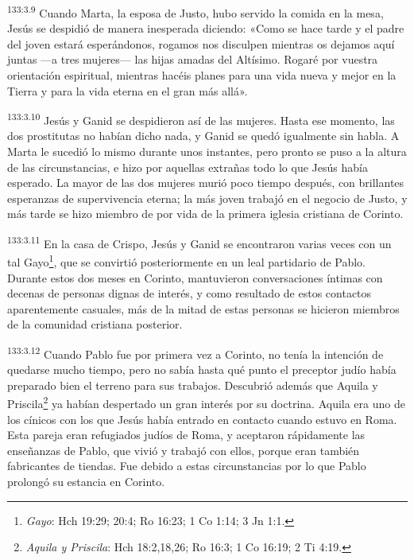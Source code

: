 \par 
\textsuperscript{133:3.9} Cuando Marta, la esposa de Justo, hubo servido la comida en la mesa, Jesús se despidió de manera inesperada diciendo: «Como se hace tarde y el padre del joven estará esperándonos, rogamos nos disculpen mientras os dejamos aquí juntas ---a tres mujeres--- las hijas amadas del Altísimo. Rogaré por vuestra orientación espiritual, mientras hacéis planes para una vida nueva y mejor en la Tierra y para la vida eterna en el gran más allá».

\par 
\textsuperscript{133:3.10} Jesús y Ganid se despidieron así de las mujeres. Hasta ese momento, las dos prostitutas no habían dicho nada, y Ganid se quedó igualmente sin habla. A Marta le sucedió lo mismo durante unos instantes, pero pronto se puso a la altura de las circunstancias, e hizo por aquellas extrañas todo lo que Jesús había esperado. La mayor de las dos mujeres murió poco tiempo después, con brillantes esperanzas de supervivencia eterna; la más joven trabajó en el negocio de Justo, y más tarde se hizo miembro de por vida de la primera iglesia cristiana de Corinto.

\par 
\textsuperscript{133:3.11} En la casa de Crispo, Jesús y Ganid se encontraron varias veces con un tal Gayo\footnote{\textit{Gayo}: Hch 19:29; 20:4; Ro 16:23; 1 Co 1:14; 3 Jn 1:1.}, que se convirtió posteriormente en un leal partidario de Pablo. Durante estos dos meses en Corinto, mantuvieron conversaciones íntimas con decenas de personas dignas de interés, y como resultado de estos contactos aparentemente casuales, más de la mitad de estas personas se hicieron miembros de la comunidad cristiana posterior.

\par 
\textsuperscript{133:3.12} Cuando Pablo fue por primera vez a Corinto, no tenía la intención de quedarse mucho tiempo, pero no sabía hasta qué punto el preceptor judío había preparado bien el terreno para sus trabajos. Descubrió además que Aquila y Priscila\footnote{\textit{Aquila y Priscila}: Hch 18:2,18,26; Ro 16:3; 1 Co 16:19; 2 Ti 4:19.} ya habían despertado un gran interés por su doctrina. Aquila era uno de los cínicos con los que Jesús había entrado en contacto cuando estuvo en Roma. Esta pareja eran refugiados judíos de Roma, y aceptaron rápidamente las enseñanzas de Pablo, que vivió y trabajó con ellos, porque eran también fabricantes de tiendas. Fue debido a estas circunstancias por lo que Pablo prolongó su estancia en Corinto.

